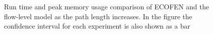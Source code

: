 \begin{figure}[ht]
	\centering
	\centering
	\caption{Run time and peak memory usage comparison of ECOFEN and the flow-level model as the path length increases. In the figure the confidence interval for each experiment is also shown as a bar}
	\label{fig:scallinks}
\end{figure}

